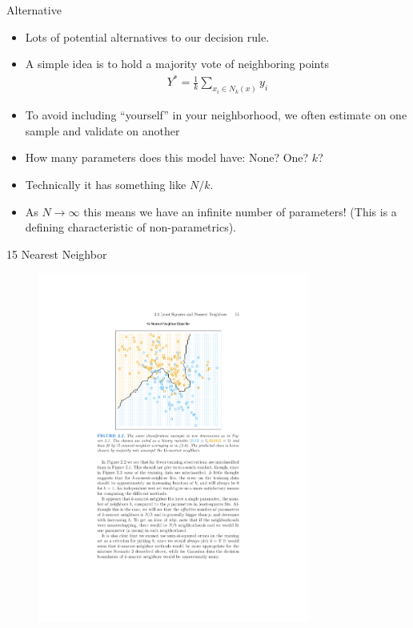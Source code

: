 \documentclass[11pt,handout,xcolor=pdftex,dvipsnames,table,mathserif]{beamer}
\begin{document}
\begin{frame}{Alternative}
\begin{itemize}
\item Lots of potential alternatives to our decision rule.
\item A simple idea is to hold a majority vote of neighboring points 
\begin{eqnarray*}
Y^{*} = \frac{1}{k} \sum_{x_i \in N_k(x)} y_i
\end{eqnarray*}
\item To avoid including ``yourself'' in your neighborhood, we often estimate on one sample and validate on another
\item How many parameters does this model have: None? One? $k$? 
\item Technically it has something like $N/k$.
\item As $N \rightarrow \infty$ this means we have an infinite number of parameters! (This is a defining characteristic of non-parametrics).
\end{itemize}
\end{frame}


\begin{frame}{15 Nearest Neighbor}
\begin{figure}[htbp]
\begin{center}
\includegraphics[width=3.5in]{./resources/classifier15nn.pdf}
\label{class15nn}
\end{center}
\end{figure}
\end{frame}
\end{document}

